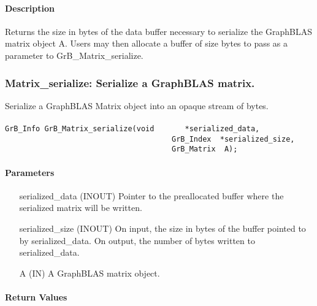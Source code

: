 \paragraph{Description}

Returns the size in bytes of the data buffer necessary to serialize the
GraphBLAS matrix object {\sf A}.  Users may then allocate a buffer of {\sf size}
bytes to pass as a parameter to {\sf GrB\_Matrix\_serialize}.


\subsubsection{{\sf Matrix\_serialize}: Serialize a GraphBLAS matrix. }
\label{Sec:Matrix_serialize}

Serialize a GraphBLAS Matrix object into an opaque stream of bytes.

\paragraph{\syntax}

\begin{Verbatim}[samepage=true]
        GrB_Info GrB_Matrix_serialize(void       *serialized_data,
                                      GrB_Index  *serialized_size,
                                      GrB_Matrix  A);
\end{Verbatim}

\paragraph{Parameters}

\begin{itemize}[leftmargin=1.1in]
    \item[{\sf serialized\_data}] ({\sf INOUT}) Pointer to the preallocated buffer where the serialized matrix will be written.
    \item[{\sf serialized\_size}] ({\sf INOUT}) On input, the size in bytes of the buffer pointed to by {\sf serialized\_data}. On output, the number of bytes written to {\sf serialized\_data}.
    \item[{\sf A}]      ({\sf IN}) A GraphBLAS matrix object.
\end{itemize}

\paragraph{Return Values}

